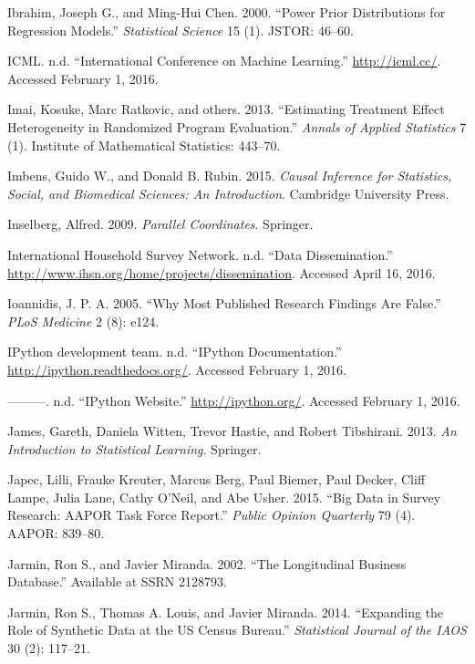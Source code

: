 \documentclass[]{krantz}
\begin{document}
\hypertarget{ref-ibrahim2000power}{}
Ibrahim, Joseph G., and Ming-Hui Chen. 2000. ``Power Prior Distributions
for Regression Models.'' \emph{Statistical Science} 15 (1). JSTOR:
46--60.

\hypertarget{ref-ICML}{}
ICML. n.d. ``International Conference on Machine Learning.''
\url{http://icml.cc/}. Accessed February 1, 2016.

\hypertarget{ref-imai2013estimating}{}
Imai, Kosuke, Marc Ratkovic, and others. 2013. ``Estimating Treatment
Effect Heterogeneity in Randomized Program Evaluation.'' \emph{Annals of
Applied Statistics} 7 (1). Institute of Mathematical Statistics:
443--70.

\hypertarget{ref-imbens2015causal}{}
Imbens, Guido W., and Donald B. Rubin. 2015. \emph{Causal Inference for
Statistics, Social, and Biomedical Sciences: An Introduction}. Cambridge
University Press.

\hypertarget{ref-inselberg2009}{}
Inselberg, Alfred. 2009. \emph{Parallel Coordinates}. Springer.

\hypertarget{ref-InternationalHouseholdSurveyNetwork}{}
International Household Survey Network. n.d. ``Data Dissemination.''
\url{http://www.ihsn.org/home/projects/dissemination}. Accessed April
16, 2016.

\hypertarget{ref-Ioannidis2005}{}
Ioannidis, J. P. A. 2005. ``Why Most Published Research Findings Are
False.'' \emph{PLoS Medicine} 2 (8): e124.

\hypertarget{ref-ipythondoc}{}
IPython development team. n.d. ``IPython Documentation.''
\url{http://ipython.readthedocs.org/}. Accessed February 1, 2016.

\hypertarget{ref-ipython}{}
---------. n.d. ``IPython Website.'' \url{http://ipython.org/}. Accessed
February 1, 2016.

\hypertarget{ref-james2013introduction}{}
James, Gareth, Daniela Witten, Trevor Hastie, and Robert Tibshirani.
2013. \emph{An Introduction to Statistical Learning}. Springer.

\hypertarget{ref-japec2015big}{}
Japec, Lilli, Frauke Kreuter, Marcus Berg, Paul Biemer, Paul Decker,
Cliff Lampe, Julia Lane, Cathy O'Neil, and Abe Usher. 2015. ``Big Data
in Survey Research: AAPOR Task Force Report.'' \emph{Public Opinion
Quarterly} 79 (4). AAPOR: 839--80.

\hypertarget{ref-jarmin2002longitudinal}{}
Jarmin, Ron S., and Javier Miranda. 2002. ``The Longitudinal Business
Database.'' Available at SSRN 2128793.

\hypertarget{ref-jarmin2014expanding}{}
Jarmin, Ron S., Thomas A. Louis, and Javier Miranda. 2014. ``Expanding
the Role of Synthetic Data at the US Census Bureau.'' \emph{Statistical
Journal of the IAOS} 30 (2): 117--21.
\end{document}
